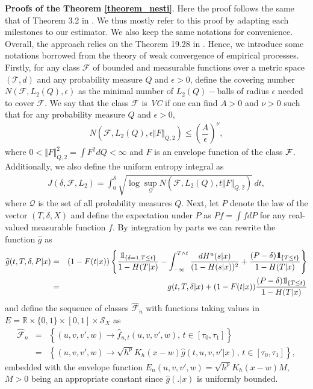 \documentclass[12pt]{article}
\def\ind{ {{\rm 1}\hskip-2.2pt{\rm l}}}
\begin{document}
\noindent
\textbf{Proofs of the Theorem \ref{theorem_nesti}}. Here the proof follows the same that of Theorem 3.2 in \cite{Escobar2019}. We thus mostly refer to this proof by adapting each milestones to our estimator. We also keep the same notations for convenience.\\ 

Overall, the approach relies on the Theorem 19.28 in \cite{Vaart1998}. Hence, we introduce some notations borrowed from the theory of weak convergence of empirical processes. Firstly, for any class $\mathcal{F}$ of bounded and measurable functions over a metric space $(\mathcal{T},d)$ and any probability measure $Q$ and $\epsilon>0$, define the covering number $N(\mathcal{F},L_2(Q),\epsilon)$ as the minimal number of $L_2(Q)-$balls of radius $\epsilon$ needed to cover $\mathcal{F}$. We say that the class $\mathcal{F}$ is \textit{VC} if one can find $A>0$ and $\nu>0$ such that for any probability measure $Q$ and $\epsilon>0$,
\begin{eqnarray*}
N(\mathcal{F},L_2(Q),\epsilon\Vert F\Vert_{Q,2})\leq\left(\dfrac{A}{\epsilon}\right)^\nu,
\end{eqnarray*} 
where $0<\Vert F\Vert^2_{Q,2}=\int F^2 dQ<\infty$ and $F$ is an envelope function of the class ${\cal F}$. Additionally, we also define the uniform entropy integral as
\begin{eqnarray*}
J(\delta,\mathcal{F},L_2) =\int_0^\delta\sqrt{\log\sup_{\mathcal{Q}}N(\mathcal{F},L_2(Q),t\Vert F\Vert_{Q,2})}\, dt,
\end{eqnarray*} 
where $\mathcal{Q}$ is the set of all probability measures $Q$. Next, let $P$ denote the law of the vector $(T,\delta,X)$ and define the expectation under $P$ as $Pf=\int fdP$ for any real-valued measurable function $f$. By integration by parts we can rewrite the function $\widehat{g}$ as
\begin{eqnarray}
\label{proof_g}
\widehat{g}(t,T,\delta,P|x)&=&(1-F(t|x))\left\{\dfrac{\ind_{\{\delta=1,T\leq t\}}}{1-H(T|x)}-\int_{-\infty}^{T\nonumber\wedge t}\dfrac{dH^u(s|x)}{(1-H(s|x))^2}+\dfrac{(P-\delta)\ind_{\{T\leq t\}}}{1-H(T|x)}\right\}\\
&=&g(t,T,\delta|x)+(1-F(t|x))\dfrac{(P-\delta)\ind_{\{T\leq t\}}}{1-H(T|x)}
\end{eqnarray}
and define the sequence of classes $\widehat{\mathcal{F}}_n$ with functions taking values in $E=\mathbb{R}\times\{0,1\}\times[0,1]\times\mathcal{S}_X$ as
\begin{eqnarray*}
\widehat{\mathcal{F}}_n &=& \left\{(u,v,v',w)\rightarrow \widehat{f}_{n,t}(u,v,v',w), \, t\in[\tau_0,\tau_1]\right\} \\
&=& \left\{(u,v,v',w)\rightarrow\sqrt{h^p}K_h(x-w)\widehat{g}(t,u,v,v'|x),\, t\in[\tau_0,\tau_1]\right\},
\end{eqnarray*}
embedded with the envelope function  $E_n(u,v,v',w)=\sqrt{h^p}K_h(x-w)M$, $M>0$ being an appropriate constant since $\widehat{g}(.|x)$ is uniformly bounded.\\
\end{document}
